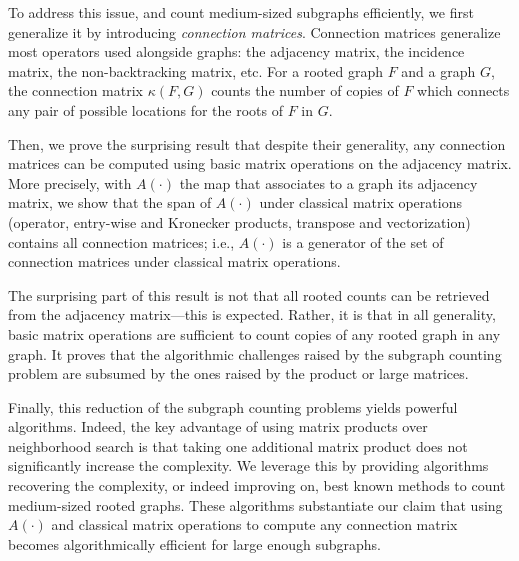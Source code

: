 \documentclass{article}
\theoremstyle{plain}
\begin{document}
To address this issue, and count medium-sized subgraphs efficiently, we first generalize it by introducing {\em connection matrices}. Connection matrices generalize most operators used alongside graphs: the adjacency matrix, the incidence matrix, the non-backtracking matrix, etc. For a rooted graph $F$ and a graph $G$, the connection matrix $\kappa(F,G)$ counts the number of copies of $F$ which connects any pair of possible locations for the roots of $F$ in $G$.

Then, we prove the surprising result that despite their generality, any connection matrices can be computed using basic matrix operations on the adjacency matrix. More precisely, with $A(\cdot)$ the map that associates to a graph its adjacency matrix, we show that the span of $A(\cdot)$ under classical matrix operations (operator, entry-wise and Kronecker products, transpose and vectorization) contains all connection matrices; i.e., $A(\cdot)$ is a generator of the set of connection matrices under classical matrix operations.

The surprising part of this result is not that all rooted counts can be retrieved from the adjacency matrix---this is expected. Rather, it is that in all generality, basic matrix operations are sufficient to count copies of any rooted graph in any graph. It proves that the algorithmic challenges raised by the subgraph counting problem are subsumed by the ones raised by the product or large matrices.

Finally, this reduction of the subgraph counting problems yields powerful algorithms. Indeed, the key advantage of using matrix products over neighborhood search is that taking one additional matrix product does not significantly increase the complexity. We leverage this by providing algorithms recovering the complexity, or indeed improving on, best known methods to count medium-sized rooted graphs. These algorithms substantiate our claim that using $A(\cdot)$ and classical matrix operations to compute any connection matrix becomes algorithmically efficient for large enough subgraphs.

\end{document}
